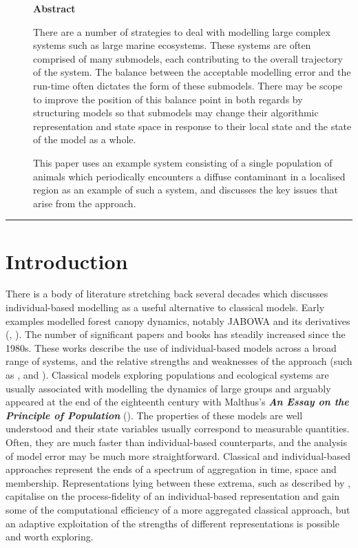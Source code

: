 \begin{description}
  \item[ ]
    \textbf{Abstract}

    There are a number of strategies to deal with modelling large complex
    systems such as large marine ecosystems. These systems are often comprised
    of many submodels, each contributing to the overall trajectory of the
    system. The balance between the acceptable modelling error and the run-time
    often dictates the form of these submodels. There may be scope to improve
    the position of this balance point in both regards by structuring models so
    that submodels may change their algorithmic representation and state space
    in response to their local state and the state of the model as a whole.
  
    This paper uses an example system consisting of a single population of
    animals which periodically encounters a diffuse contaminant in a localised
    region as an example of such a system, and discusses the key issues that
    arise from the approach.
\end{description}

\rule{\textwidth}{2pt}

\section{Introduction}\label{Intro}

There is a body of literature stretching back several decades which discusses
individual-based modelling as a useful alternative to classical models. Early
examples modelled forest canopy dynamics, notably JABOWA and its derivatives
(\citet{Botkin72:1}, \citet{Botkin72:2}). The number of significant papers and
books has steadily increased since the 1980s. These works describe the use of
individual-based models across a broad range of systems, and the relative
strengths and weaknesses of the approach (such as \citet{Huston88:1},
\citet{DeAngelis92:1} and \citet{Grimm05:1}). Classical models exploring
populations and ecological systems are usually associated with modelling the
dynamics of large groups and arguably appeared at the end of the eighteenth
century with Malthus's {\em{{\textbf{An Essay on the Principle of
Population}}}}\/ (\citeyear{Malthus:1}). The properties of these models are well
understood and their state variables usually correspond to measurable
quantities. Often, they are much faster than individual-based counterparts,
and the analysis of model error may be much more straightforward. Classical
and individual-based approaches represent the ends of a spectrum of
aggregation in time, space and membership. Representations lying between these
extrema, such as described by \citet{Scheffer95:1}, capitalise on the
process-fidelity of an individual-based representation and gain some of the
computational efficiency of a more aggregated classical approach, but an
adaptive exploitation of the strengths of different representations is
possible and worth exploring.

